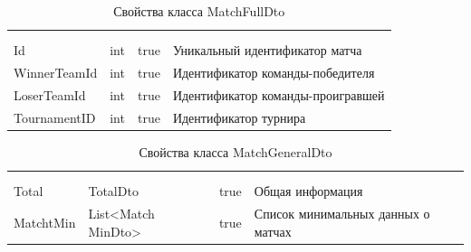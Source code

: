 \begin{xltabular}{\textwidth}{|X|X|X|X|}
	\caption{Свойства класса MatchFullDto}\label{table:MatchFullDto}\\ \hline
	 &  &  &  \\ \hline
	 &  &  &  \\ \hline
	\endfirsthead
	 \hline
	 &  &  &  \\ \hline
	\endhead
	Id & int & true & Уникальный идентификатор матча \\ \hline
	WinnerTeamId & int & true & Идентификатор команды-победителя \\ \hline
	LoserTeamId & int & true & Идентификатор команды-проигравшей \\ \hline
	TournamentID & int & true & Идентификатор турнира \\ \hline
\end{xltabular}

\begin{xltabular}{\textwidth}{|X|X|c|X|}
	\caption{Свойства класса MatchGeneralDto}\label{table:MatchGeneralDto}\\ \hline
	 &  &  &  \\ \hline
	 &  &  &  \\ \hline
	\endfirsthead
	 \hline
	 &  &  &  \\ \hline
	\endhead
	Total & TotalDto & true & Общая информация \\ \hline
	MatchtMin & List<Match
	MinDto> & true & Список минимальных данных о матчах \\ \hline
\end{xltabular}

